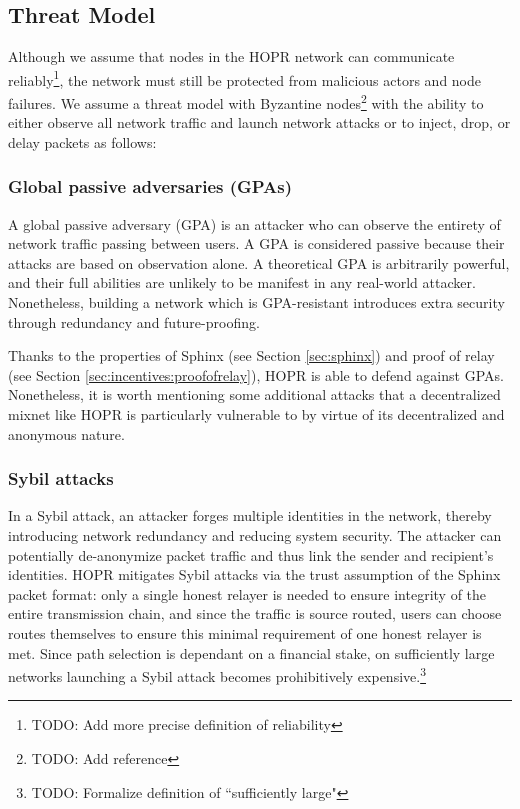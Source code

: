 \subsection{Threat Model}
\label{sec:intro:threatmodel}

Although we assume that nodes in the HOPR network can communicate reliably\footnote{TODO: Add more precise definition of reliability}, the network must still be protected from malicious actors and node failures. We assume a threat model with Byzantine nodes\footnote{TODO: Add reference} with the ability to either observe all network traffic and launch network attacks or to inject, drop, or delay packets as follows:

\subsubsection{Global passive adversaries (GPAs)} A global passive adversary (GPA) is an attacker who can observe the entirety of network traffic passing between users. A GPA is considered passive because their attacks are based on observation alone. A theoretical GPA is arbitrarily powerful, and their full abilities are unlikely to be manifest in any real-world attacker. Nonetheless, building a network which is GPA-resistant introduces extra security through redundancy and future-proofing.

Thanks to the properties of Sphinx (see Section \ref{sec:sphinx}) and proof of relay (see Section \ref{sec:incentives:proofofrelay}), HOPR is able to defend against GPAs. Nonetheless, it is worth mentioning some additional attacks that a decentralized mixnet like HOPR is particularly vulnerable to by virtue of its decentralized and anonymous nature.

\subsubsection{Sybil attacks}
In a Sybil attack, an attacker forges multiple identities in the network, thereby introducing network redundancy and reducing system security. The attacker can potentially de-anonymize packet traffic and thus link the sender and recipient's identities. HOPR mitigates Sybil attacks via the trust assumption of the Sphinx packet format: only a single honest relayer is needed to ensure integrity of the entire transmission chain, and since the traffic is source routed, users can choose routes themselves to ensure this minimal requirement of one honest relayer is met. Since path selection is dependant on a financial stake, on sufficiently large networks launching a Sybil attack becomes prohibitively expensive.\footnote{TODO: Formalize definition of ``sufficiently large"}


